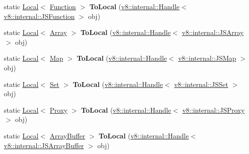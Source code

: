 \begin{DoxyCompactItemize}
\item 
\mbox{\label{classv8_1_1Utils_a1c280b10d8fb7ed3cc7f7e139c9f9a42}} 
static \mbox{\hyperlink{classv8_1_1Local}{Local}}$<$ \mbox{\hyperlink{classv8_1_1Function}{Function}} $>$ {\bfseries To\+Local} (\mbox{\hyperlink{classv8_1_1internal_1_1Handle}{v8\+::internal\+::\+Handle}}$<$ \mbox{\hyperlink{classv8_1_1internal_1_1JSFunction}{v8\+::internal\+::\+J\+S\+Function}} $>$ obj)
\item 
\mbox{\label{classv8_1_1Utils_a574263d874f1c510592f745e3e26089b}} 
static \mbox{\hyperlink{classv8_1_1Local}{Local}}$<$ \mbox{\hyperlink{classv8_1_1Array}{Array}} $>$ {\bfseries To\+Local} (\mbox{\hyperlink{classv8_1_1internal_1_1Handle}{v8\+::internal\+::\+Handle}}$<$ \mbox{\hyperlink{classv8_1_1internal_1_1JSArray}{v8\+::internal\+::\+J\+S\+Array}} $>$ obj)
\item 
\mbox{\label{classv8_1_1Utils_a5c596d6b1b5fec92ae8bcdec13edc4fc}} 
static \mbox{\hyperlink{classv8_1_1Local}{Local}}$<$ \mbox{\hyperlink{classv8_1_1Map}{Map}} $>$ {\bfseries To\+Local} (\mbox{\hyperlink{classv8_1_1internal_1_1Handle}{v8\+::internal\+::\+Handle}}$<$ \mbox{\hyperlink{classv8_1_1internal_1_1JSMap}{v8\+::internal\+::\+J\+S\+Map}} $>$ obj)
\item 
\mbox{\label{classv8_1_1Utils_ac3774c0f66b1b6a3d8de716ef7aebe9e}} 
static \mbox{\hyperlink{classv8_1_1Local}{Local}}$<$ \mbox{\hyperlink{classv8_1_1Set}{Set}} $>$ {\bfseries To\+Local} (\mbox{\hyperlink{classv8_1_1internal_1_1Handle}{v8\+::internal\+::\+Handle}}$<$ \mbox{\hyperlink{classv8_1_1internal_1_1JSSet}{v8\+::internal\+::\+J\+S\+Set}} $>$ obj)
\item 
\mbox{\label{classv8_1_1Utils_a2394394d4f782cf2e1dffd302689b81f}} 
static \mbox{\hyperlink{classv8_1_1Local}{Local}}$<$ \mbox{\hyperlink{classv8_1_1Proxy}{Proxy}} $>$ {\bfseries To\+Local} (\mbox{\hyperlink{classv8_1_1internal_1_1Handle}{v8\+::internal\+::\+Handle}}$<$ \mbox{\hyperlink{classv8_1_1internal_1_1JSProxy}{v8\+::internal\+::\+J\+S\+Proxy}} $>$ obj)
\item 
\mbox{\label{classv8_1_1Utils_ac51eb1eb431ba42ecf23ca81e6e2f4f1}} 
static \mbox{\hyperlink{classv8_1_1Local}{Local}}$<$ \mbox{\hyperlink{classv8_1_1ArrayBuffer}{Array\+Buffer}} $>$ {\bfseries To\+Local} (\mbox{\hyperlink{classv8_1_1internal_1_1Handle}{v8\+::internal\+::\+Handle}}$<$ \mbox{\hyperlink{classv8_1_1internal_1_1JSArrayBuffer}{v8\+::internal\+::\+J\+S\+Array\+Buffer}} $>$ obj)

\end{DoxyCompactItemize}
